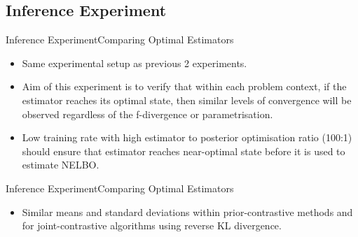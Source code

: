 \documentclass{beamer}
\begin{document}
\subsection{Inference Experiment}
\begin{frame}{Inference Experiment}{Comparing Optimal Estimators}
\begin{itemize}
\item Same experimental setup as previous 2 experiments.
\item Aim of this experiment is to verify that within each problem context, if the estimator reaches its optimal state, then similar levels of convergence will be observed regardless of the f-divergence or parametrisation.
\item Low training rate with high estimator to posterior optimisation ratio (100:1) should ensure that estimator reaches near-optimal state before it is used to estimate NELBO.
\end{itemize}
\end{frame}
\begin{frame}{Inference Experiment}{Comparing Optimal Estimators}
\begin{table}[h]
\end{table}
\begin{itemize}
\item Similar means and standard deviations within prior-contrastive methods and for joint-contrastive algorithms using reverse KL divergence.
\end{itemize}
\end{frame}
\end{document}
